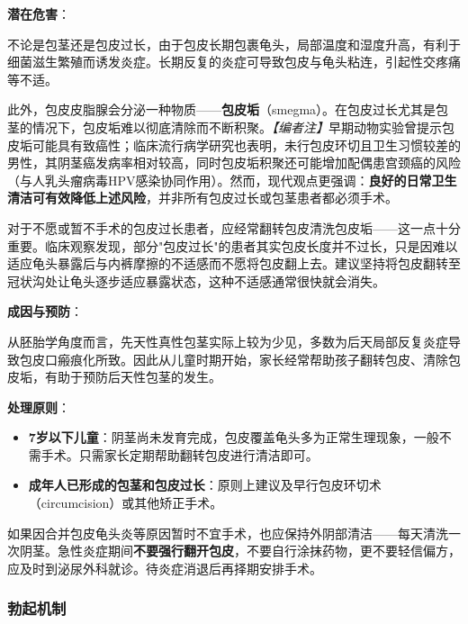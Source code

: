 \vspace{0.5em}
\noindent\textbf{潜在危害}：

不论是包茎还是包皮过长，由于包皮长期包裹龟头，局部温度和湿度升高，有利于细菌滋生繁殖而诱发炎症。长期反复的炎症可导致包皮与龟头粘连，引起性交疼痛等不适。

此外，包皮皮脂腺会分泌一种物质——\textbf{包皮垢}（smegma）。在包皮过长尤其是包茎的情况下，包皮垢难以彻底清除而不断积聚。\textit{【编者注】}早期动物实验曾提示包皮垢可能具有致癌性；临床流行病学研究也表明，未行包皮环切且卫生习惯较差的男性，其阴茎癌发病率相对较高，同时包皮垢积聚还可能增加配偶患宫颈癌的风险（与人乳头瘤病毒HPV感染协同作用）。然而，现代观点更强调：\textbf{良好的日常卫生清洁可有效降低上述风险}，并非所有包皮过长或包茎患者都必须手术。

对于不愿或暂不手术的包皮过长患者，应经常翻转包皮清洗包皮垢——这一点十分重要。临床观察发现，部分"包皮过长"的患者其实包皮长度并不过长，只是因难以适应龟头暴露后与内裤摩擦的不适感而不愿将包皮翻上去。建议坚持将包皮翻转至冠状沟处让龟头逐步适应暴露状态，这种不适感通常很快就会消失。

\vspace{0.5em}
\noindent\textbf{成因与预防}：

从胚胎学角度而言，先天性真性包茎实际上较为少见，多数为后天局部反复炎症导致包皮口瘢痕化所致。因此从儿童时期开始，家长经常帮助孩子翻转包皮、清除包皮垢，有助于预防后天性包茎的发生。

\vspace{0.5em}
\noindent\textbf{处理原则}：
\begin{itemize}
	\item \textbf{7岁以下儿童}：阴茎尚未发育完成，包皮覆盖龟头多为正常生理现象，一般不需手术。只需家长定期帮助翻转包皮进行清洁即可。
	\item \textbf{成年人已形成的包茎和包皮过长}：原则上建议及早行包皮环切术（circumcision）或其他矫正手术。
\end{itemize}

\begin{tcolorbox}[colback=pink!5!white,colframe=red!50!black,title=贴心小叮咛]
如果因合并包皮龟头炎等原因暂时不宜手术，也应保持外阴部清洁——每天清洗一次阴茎。急性炎症期间\textbf{不要强行翻开包皮}，不要自行涂抹药物，更不要轻信偏方，应及时到泌尿外科就诊。待炎症消退后再择期安排手术。
\end{tcolorbox}
\subsubsection{勃起机制}

